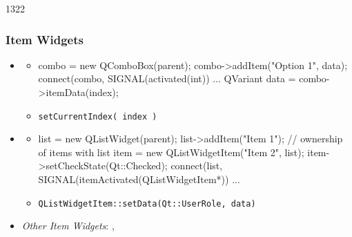 \begin{slide}[fragile]{1322}
  \frametitle{Item Widgets}
  \begin{itemize}
  \item \textbf{}
    \begin{itemize}
    \item[]
      \begin{cpp}
combo = new QComboBox(parent);        
combo->addItem("Option 1", data);
connect(combo, SIGNAL(activated(int)) ...
QVariant data = combo->itemData(index);
     \end{cpp}
   \item \texttt{setCurrentIndex( index )}
   \end{itemize}

  \item \textbf{}
    \begin{itemize}
    \item[]
      \begin{cpp}
list = new QListWidget(parent);
list->addItem("Item 1");
// ownership of items with list
item = new QListWidgetItem("Item 2", list);
item->setCheckState(Qt::Checked);        
connect(list, SIGNAL(itemActivated(QListWidgetItem*)) ...
      \end{cpp}
    \item \texttt{QListWidgetItem::setData(Qt::UserRole, data)}

   \end{itemize}
   \medskip
 \item \textit{Other Item Widgets}: , 
 \end{itemize}

\end{slide}

